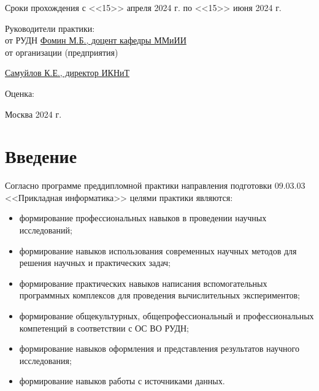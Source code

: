 \documentclass{article}
\begin{document}
\begin{titlepage}
    Сроки прохождения с <<15>> апреля 2024 г. по <<15>> июня 2024 г.

    \vspace*{\fill}

    \begin{adjustwidth}{0.4\textwidth}{0pt}
      Руководители практики:\\

      от РУДН \underline{Фомин М.Б., доцент  кафедры ММиИИ}\\

      от организации (предприятия)

      \underline{Самуйлов К.Е., директор ИКНиТ}
       
    \end{adjustwidth}
    \vspace{1em}
    
    Оценка: \underline{\phantom{1234567890 баллов}}

    \vspace*{\fill}
     
    \centering Москва 2024 г.
    \thispagestyle{empty} %
     
\end{titlepage}
    
\newpage

\tableofcontents

\newpage

\section{Введение}

Согласно программе преддипломной практики направления подготовки 09.03.03 <<Прикладная информатика>> целями практики являются:
\begin{itemize}
\item формирование профессиональных навыков в проведении научных исследований;
\item формирование навыков использования современных научных методов для решения научных и практических задач;
\item формирование практических навыков написания вспомогательных программных комплексов для проведения вычислительных экспериментов;
\item формирование общекультурных, общепрофессиональный и профессиональных компетенций в соответствии с ОС ВО РУДН;
\item формирование навыков оформления и представления результатов научного исследования;
\item формирование навыков работы с источниками данных.
\end{itemize}
\end{document}
